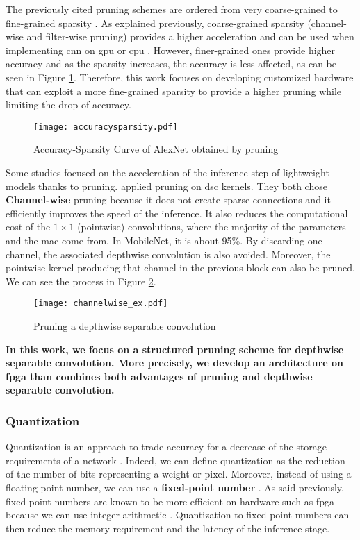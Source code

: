 %
The previously cited pruning schemes are ordered from very coarse-grained to fine-grained sparsity \cite{mao_exploring_2017}. As explained previously, coarse-grained sparsity (channel-wise and filter-wise pruning) provides a higher acceleration and can be used when implementing \acrshort{cnn} on \acrshort{gpu} or \acrshort{cpu} \cite{cheng_recent_2018, mao_exploring_2017}. However, finer-grained ones provide higher accuracy and as the sparsity increases, the accuracy is less affected, as can be seen in Figure \ref{fig:pruning-accuracy}. Therefore, this work focuses on developing customized hardware that can exploit a more fine-grained sparsity \cite{mao_exploring_2017} to provide a higher pruning while limiting the drop of accuracy.
%
\begin{figure}[H]
    \centering
    \texttt{[image: accuracysparsity.pdf]}
    \caption{Accuracy-Sparsity Curve of AlexNet obtained by pruning \cite{mao_exploring_2017}}
    \label{fig:pruning-accuracy}
\end{figure}
%
Some studies focused on the acceleration of the inference step of lightweight models thanks to pruning. \textcite{zhang_channel_2019, tu_pruning_2019} applied pruning on \acrshort{dsc} kernels. They both chose \textbf{Channel-wise} pruning because it does not create sparse connections and it efficiently improves the speed of the inference. It also reduces the computational cost of the $1 \times 1$ (pointwise) convolutions, where the majority of the parameters and the \acrshort{mac} come from. In MobileNet, it is about 95\%. By discarding one channel, the associated depthwise convolution is also avoided.
Moreover, the pointwise kernel producing that channel in the previous block can also be pruned. We can see the process in Figure \ref{fig:pruning_dsc}.
%
\begin{figure}[H]
    \centering
    \texttt{[image: channelwise\_ex.pdf]}
    \caption{Pruning a depthwise separable convolution \cite{tu_pruning_2019}}
    \label{fig:pruning_dsc}
\end{figure}

\textbf{In this work, we focus on a structured pruning scheme for depthwise separable convolution. More precisely, we develop an architecture on \acrshort{fpga} than combines both advantages of pruning and depthwise separable convolution.}
%
\subsubsection{Quantization} \label{subs:quantization}
%
%
Quantization is an approach to trade accuracy for a decrease of the storage requirements of a network \cite{han_deep_2016}. Indeed, we can define quantization as the reduction of the number of bits representing a weight or pixel. Moreover, instead of using a floating-point number, we can use a \textbf{fixed-point number} \cite{cheng_recent_2018}. As said previously, fixed-point numbers are known to be more efficient on hardware such as \acrshort{fpga} because we can use integer arithmetic \cite{david_hardware_2007}. Quantization to fixed-point numbers can then reduce the memory requirement and the latency of the inference stage.

